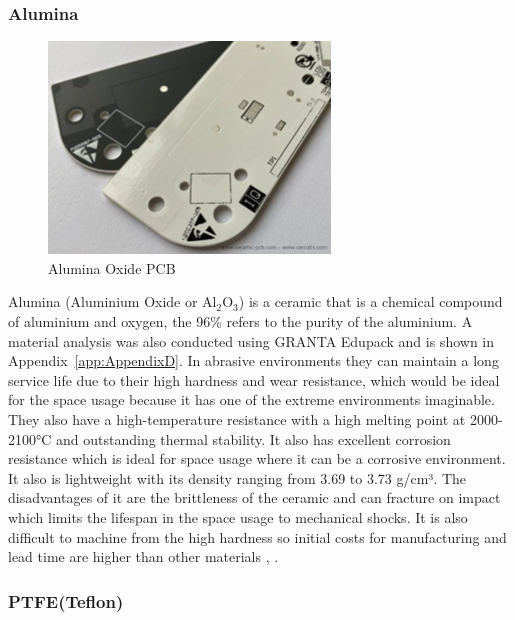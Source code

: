 \subsubsection{Alumina}

\begin{figure}[htbp]
    \centering
    \includegraphics[width=7.5cm]{chapters/methodology/MaterialAnalysis/Fig2AluminaPCB.png}
    \caption{Alumina Oxide PCB \cite{RefWorks:cercuits2025aluminum}}
    \label{fig:alumina-pcb}
\end{figure}
Alumina (Aluminium Oxide or Al$_2$O$_3$) is a ceramic that is a chemical compound of aluminium and oxygen, the 96\% refers to the purity of the aluminium.
A material analysis was also conducted using GRANTA Edupack and is shown in Appendix~\ref{app:AppendixD}. 
In abrasive environments they can maintain a long service life due to their high hardness and wear resistance, which would be ideal for the space usage because it has one of the extreme environments imaginable. 
They also have a high-temperature resistance with a high melting point at 2000-2100°C and outstanding thermal stability. 
It also has excellent corrosion resistance which is ideal for space usage where it can be a corrosive environment. 
It also is lightweight with its density ranging from 3.69 to 3.73 g/cm³. 
The disadvantages of it are the brittleness of the ceramic and can fracture on impact which limits the lifespan in the space usage to mechanical shocks. 
It is also difficult to machine from the high hardness so initial costs for manufacturing and lead time are higher than other materials \cite{mascera-tec}, \cite{Vhandy}.

\subsubsection{PTFE(Teflon)}

